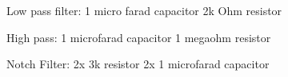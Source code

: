 Low pass filter:
1 micro farad capacitor
2k Ohm resistor


High pass:
1 microfarad capacitor
1 megaohm resistor

Notch Filter:
2x 3k resistor
2x 1 microfarad capacitor
